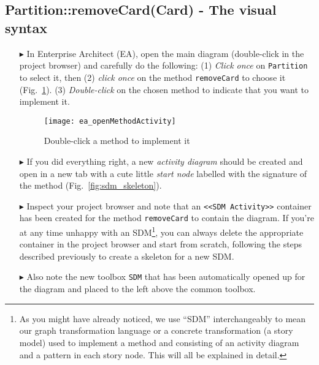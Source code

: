 \newpage
\subsection{Partition::removeCard(Card) - The visual syntax}
\visHeader
\hypertarget{remCard vis}{}

\begin{itemize}

\item[$\blacktriangleright$] In Enterprise Architect (EA), open the main diagram (double-click in the project browser) and carefully do the following: (1) \emph{Click once} on
\texttt{Partition} to select it, then (2) \emph{click once} on the method \texttt{removeCard} to choose it (Fig.~\ref{fig:sdm_start}). (3) \emph{Double-click}
on the chosen method to indicate that you want to implement it.

\begin{figure}[htp]
\begin{center}
  \texttt{[image: ea\_openMethodActivity]}
  \caption{Double-click a method to implement it}  
  \label{fig:sdm_start}
\end{center}
\end{figure}
 
\item[$\blacktriangleright$] If you did everything right, a new \emph{activity diagram} should be created and open in a new tab with a cute little \emph{start node} 
labelled with the signature of the method (Fig.~\ref{fig:sdm_skeleton}).  

\item[$\blacktriangleright$] Inspect your project browser and note that an \texttt{<<SDM Activity>>} container has been created for the method
\texttt{removeCard} to contain the diagram. If you're at any time unhappy with an SDM\footnote{As you might have already noticed, we use ``SDM'' interchangeably
to mean our graph transformation language or a concrete transformation (a story model) used to implement a method and consisting of an activity diagram and a
pattern in each story node. This will all be explained in detail.}, you can always delete the appropriate container in the project browser and start from
scratch, following the steps described previously to create a skeleton for a new SDM. 

\item[$\blacktriangleright$] Also note the new toolbox \texttt{SDM} that has been automatically opened up for the diagram and placed to the left above the 
common toolbox.


\end{itemize}
